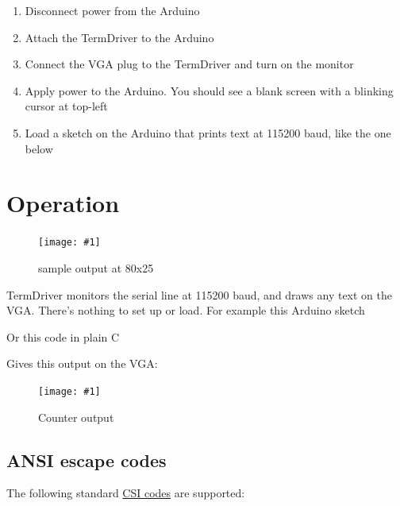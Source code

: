 \documentclass{article}
\newcommand{\png}[2]{
\begin{figure}[H]
\begin{center}
\texttt{[image: \#1]}
\caption{#2}
\end{center}
\end{figure}
}
\begin{document}
\begin{enumerate}
\item Disconnect power from the Arduino
\item Attach the TermDriver to the Arduino
\item Connect the VGA plug to the TermDriver and turn on the monitor
\item Apply power to the Arduino. You should see a blank screen with a blinking cursor at top-left
\item Load a sketch on the Arduino that prints text at 115200 baud, like the one below
\end{enumerate}

\newcommand{\eg}[1]{
\begin{framed}

\end{framed}
}

\eg{termdriver-helloworld}

\section{Operation}

\png{img/page1}{sample output at 80x25}

TermDriver monitors the serial line at 115200 baud, and draws any
text on the VGA.
There's nothing to set up or load.
For example this Arduino sketch

\eg{termdriver-counter1}

\noindent
Or this code in plain C

\eg{termdriver-counter2}

\noindent
Gives this output on the VGA:

\png{img/page2}{Counter output}

\subsection{ANSI escape codes}

The following standard
\href{https://en.wikipedia.org/wiki/ANSI_escape_code\#CSI_sequences}{CSI codes}
are supported:
\end{document}
